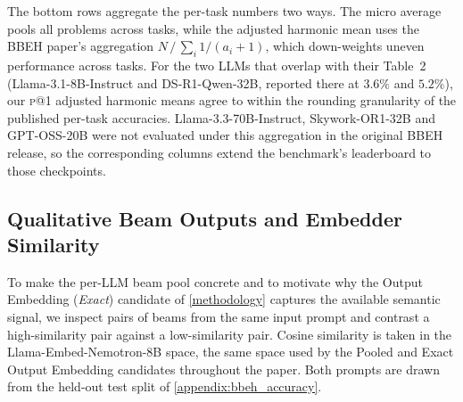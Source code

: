 The bottom rows aggregate the per-task numbers two ways. The micro
average pools all problems across tasks, while the adjusted harmonic
mean uses the BBEH paper's aggregation $N\,/\,\sum_i 1/(a_i+1)$, which
down-weights uneven performance across tasks. For the two LLMs that
overlap with their Table~2 (Llama-3.1-8B-Instruct and DS-R1-Qwen-32B,
reported there at $3.6\%$ and $5.2\%$), our \textsc{p@1} adjusted
harmonic means agree to within the rounding granularity of the
published per-task accuracies. Llama-3.3-70B-Instruct, Skywork-OR1-32B
and GPT-OSS-20B were not evaluated under this aggregation in the
original BBEH release, so the corresponding columns extend the
benchmark's leaderboard to those checkpoints.



\subsection{Qualitative Beam Outputs and Embedder Similarity}
\label{appendix:beam_similarity}

To make the per-LLM beam pool concrete and to motivate why the
Output Embedding (\emph{Exact}) candidate of \cref{methodology}
captures the available semantic signal, we inspect pairs of beams from
the same input prompt and contrast a high-similarity pair against a
low-similarity pair. Cosine similarity is taken in the
Llama-Embed-Nemotron-8B space, the same space used by the Pooled and
Exact Output Embedding candidates throughout the paper. Both prompts
are drawn from the held-out test split of \cref{appendix:bbeh_accuracy}.

